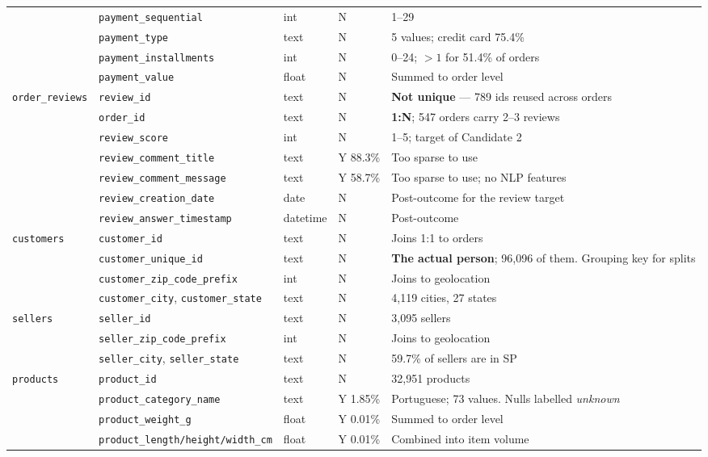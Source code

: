 \documentclass[11pt,a4paper]{article}
\newcommand{\code}[1]{\texttt{\small #1}}
\begin{document}
\begin{table}[htbp]
\begin{tabular}{@{}p{2.05cm}p{4.5cm}p{1.15cm}p{1.05cm}p{5.75cm}@{}}
 & \code{payment\_sequential} & int & N & 1--29 \\
 & \code{payment\_type} & text & N & 5 values; credit card 75.4\% \\
 & \code{payment\_installments} & int & N & 0--24; $>1$ for 51.4\% of orders \\
 & \code{payment\_value} & float & N & Summed to order level \\
\midrule
\code{order\_reviews} & \code{review\_id} & text & N & \textbf{Not unique} --- 789 ids reused across orders \\
 & \code{order\_id} & text & N & \textbf{1:N}; 547 orders carry 2--3 reviews \\
 & \code{review\_score} & int & N & 1--5; target of Candidate 2 \\
 & \code{review\_comment\_title} & text & Y 88.3\% & Too sparse to use \\
 & \code{review\_comment\_message} & text & Y 58.7\% & Too sparse to use; no NLP features \\
 & \code{review\_creation\_date} & date & N & Post-outcome for the review target \\
 & \code{review\_answer\_timestamp} & datetime & N & Post-outcome \\
\midrule
\code{customers} & \code{customer\_id} & text & N & Joins 1:1 to orders \\
 & \code{customer\_unique\_id} & text & N & \textbf{The actual person}; 96,096 of them. Grouping key for splits \\
 & \code{customer\_zip\_code\_prefix} & int & N & Joins to geolocation \\
 & \code{customer\_city}, \code{customer\_state} & text & N & 4,119 cities, 27 states \\
\midrule
\code{sellers} & \code{seller\_id} & text & N & 3,095 sellers \\
 & \code{seller\_zip\_code\_prefix} & int & N & Joins to geolocation \\
 & \code{seller\_city}, \code{seller\_state} & text & N & 59.7\% of sellers are in SP \\
\midrule
\code{products} & \code{product\_id} & text & N & 32,951 products \\
 & \code{product\_category\_name} & text & Y 1.85\% & Portuguese; 73 values. Nulls labelled \emph{unknown} \\
 & \code{product\_weight\_g} & float & Y 0.01\% & Summed to order level \\
 & \code{product\_length/height/width\_cm} & float & Y 0.01\% & Combined into item volume \\

\end{tabular}
\end{table}
\end{document}
